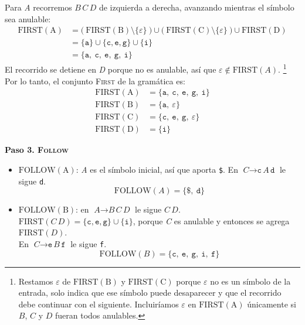 \documentclass[12pt,letterpaper]{article}
\newcommand{\nt}[1]{\textit{#1}}
\newcommand{\tk}[1]{\texttt{#1}}
\newcommand{\tx}[1]{\text{#1}}
\newcommand{\First}[1]{\mathrm{FIRST}(#1)}
\newcommand{\Follow}[1]{\mathrm{FOLLOW}(#1)}
\newcommand{\eps}{\varepsilon}
\begin{document}
\begin{enumerate}[label=\arabic*.]
\begin{itemize}
    Para \nt{A} recorremos $\nt{B}\,\nt{C}\,\nt{D}$ de izquierda a derecha, avanzando mientras el símbolo sea
    anulable:
    \[
    \begin{aligned}
      \First{\tx{A}} &= \big(\ \First{\tx{B}}\setminus\{\eps\}\ \big)
                        \cup
                        \big(\ \First{\tx{C}}\setminus\{\eps\}\ \big)
                        \cup
                        \First{\tx{D}} \\
                     &= \{\tk{a}\} \cup \{\tk{c},\tk{e},\tk{g}\} \cup \{\tk{i}\} \\
                     &= \{\tk{a},\ \tk{c},\ \tk{e},\ \tk{g},\ \tk{i}\}
    \end{aligned}
    \]
    El recorrido se detiene en \nt{D} porque no es anulable, así que $\eps \notin \First{\nt{A}}$. \footnote{Restamos $\eps$ de $\First{\tx{B}}$ y $\First{\tx{C}}$ porque $\eps$ no es un símbolo de la entrada, solo indica que
    ese símbolo puede desaparecer y que el recorrido debe continuar con el siguiente. Incluiríamos $\eps$ en
    $\First{\tx{A}}$ únicamente si $\nt{B}$, $\nt{C}$ y $\nt{D}$ fueran todos anulables.} \\
    
    Por lo tanto, el conjunto \textsc{First} de la gramática es:
    \[
    \begin{aligned}
      \First{\tx{A}} &= \{\tk{a},\ \tk{c},\ \tk{e},\ \tk{g},\ \tk{i}\} \\
      \First{\tx{B}} &= \{\tk{a},\ \eps\} \\
      \First{\tx{C}} &= \{\tk{c},\ \tk{e},\ \tk{g},\ \eps\}\\
      \First{\tx{D}} &= \{\tk{i}\}
    \end{aligned}
    \]

    \newpage
    
    \textbf{Paso 3. \textsc{Follow}}\\
    \begin{itemize}
    \item $\Follow{\tx{A}}$: \nt{A} es el símbolo inicial, así que aporta \tk{\$}.
      En $\nt{C}\to\tk{c}\,\nt{A}\,\tk{d}$ le sigue \tk{d}.
      \[
      \Follow{\nt{A}} = \{\tk{\$},\ \tk{d}\}
      \]
      
    \item $\Follow{\tx{B}}$: en $\nt{A}\to\nt{B}\,\nt{C}\,\nt{D}$ le sigue $\nt{C}\,\nt{D}$.\\
      $\First{\nt{C}\,\nt{D}} = \{\tk{c},\tk{e},\tk{g}\}\cup\{\tk{i}\}$, porque \nt{C} es anulable y entonces se
      agrega $\First{\nt{D}}$.\\
      En $\nt{C}\to\tk{e}\,\nt{B}\,\tk{f}$ le sigue \tk{f}.
      \[
      \Follow{\nt{B}} = \{\tk{c},\ \tk{e},\ \tk{g},\ \tk{i},\ \tk{f}\}
      \]
      

\end{itemize}
\end{itemize}
\end{enumerate}
\end{document}
